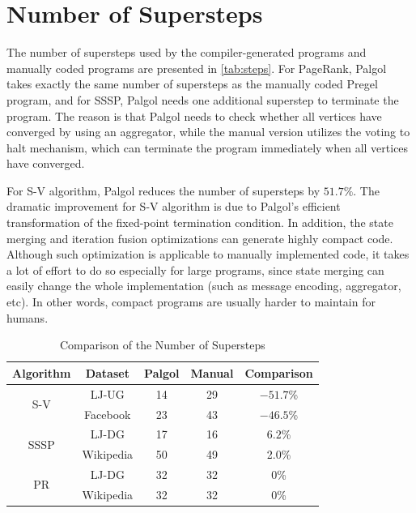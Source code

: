 \documentclass{sokendai_thesis} %
\begin{document}
\section{Number of Supersteps}

The number of supersteps used by the compiler-generated programs and manually coded programs are presented in \autoref{tab:steps}.
For PageRank, Palgol takes exactly the same number of supersteps as the manually coded Pregel program, and for SSSP, Palgol needs one additional superstep to terminate the program.
The reason is that Palgol needs to check whether all vertices have converged by using an aggregator, while the manual version utilizes the voting to halt mechanism, which can terminate the program immediately when all vertices have converged.

For S-V algorithm, Palgol reduces the number of supersteps by $51.7\%$.
The dramatic improvement for S-V algorithm is due to Palgol's efficient transformation of the fixed-point termination condition.
In addition, the state merging and iteration fusion optimizations can generate highly compact code.
Although such optimization is applicable to manually implemented code, it takes a lot of effort to do so especially for large programs, since state merging can easily change the whole implementation (such as message encoding, aggregator, etc).
In other words, compact programs are usually harder to maintain for humans.

\begin{table}[t]
 \centering
 \caption{Comparison of the Number of Supersteps}
 \label{tab:steps}
 \begin{tabular}{c|c|c|c|c}
  \hline
  \textbf{Algorithm} & \textbf{Dataset} & Palgol & Manual & Comparison \\
  \hline\hline
  \multirow{2}{*}{S-V} & LJ-UG & 14 & 29 & $-51.7$\% \\
  \cline{2-5}
  & Facebook & 23 & 43 & $-46.5$\% \\
  \hline
  \multirow{2}{*}{SSSP} & LJ-DG & 17 & 16 & $6.2$\% \\
  \cline{2-5}
  & Wikipedia & 50 & 49 & 2.0\% \\
  \hline
  \multirow{2}{*}{PR} & LJ-DG & 32 & 32 & $0$\% \\
  \cline{2-5}
  & Wikipedia & 32 & 32 & $0$\% \\
  \hline
 \end{tabular}
\vspace{-2ex}\end{table}
\end{document}
